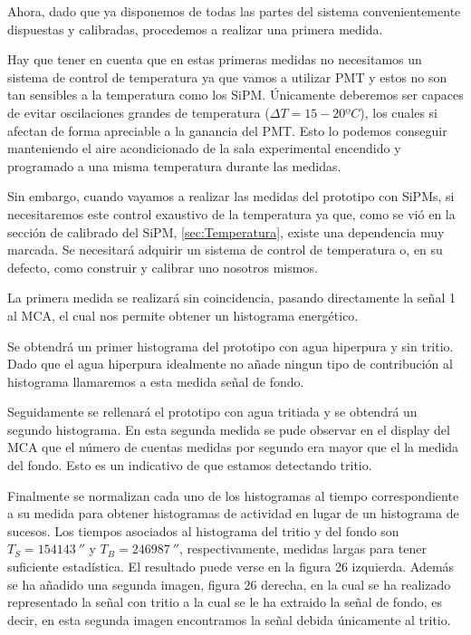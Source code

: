 Ahora, dado que ya disponemos de todas las partes del sistema convenientemente dispuestas y calibradas, procedemos a realizar una primera medida.

Hay que tener en cuenta que en estas primeras medidas no necesitamos un sistema de control de temperatura ya que vamos a utilizar PMT y estos no son tan sensibles a la temperatura como los SiPM. Únicamente deberemos ser capaces de evitar oscilaciones grandes de temperatura ($\Delta T=15-20ºC$), los cuales si afectan de forma apreciable a la ganancia del PMT. Esto lo podemos conseguir manteniendo el aire acondicionado de la sala experimental encendido y programado a una misma temperatura durante las medidas. 

Sin embargo, cuando vayamos a realizar las medidas del prototipo con SiPMs, si necesitaremos este control exaustivo de la temperatura ya que, como se vió en la sección de calibrado del SiPM, \ref{sec:Temperatura}, existe una dependencia muy marcada. Se necesitará adquirir un sistema de control de temperatura o, en su defecto, como construir y calibrar uno nosotros mismos.

La primera medida se realizará sin coincidencia, pasando directamente la señal 1 al MCA, el cual nos permite obtener un histograma energético.

Se obtendrá un primer histograma del prototipo con agua hiperpura y sin tritio. Dado que el agua hiperpura idealmente no añade ningun tipo de contribución al histograma llamaremos a esta medida señal de fondo. 

Seguidamente se rellenará el prototipo con agua tritiada y se obtendrá un segundo histograma. En esta segunda medida se pude observar en el display del MCA que el número de cuentas medidas por segundo era mayor que el la medida del fondo. Esto es un indicativo de que estamos detectando tritio. 

Finalmente se normalizan cada uno de los histogramas al tiempo correspondiente a su medida para obtener histogramas de actividad en lugar de un histograma de sucesos. Los tiempos asociados al histograma del tritio y del fondo son $T_S=154143~\second$  y $T_B=246987~\second$, respectivamente, medidas largas para tener suficiente estadística. El resultado puede verse en la figura 26 izquierda. Además se ha añadido una segunda imagen, figura 26 derecha, en la cual se ha realizado representado la señal con tritio a la cual se le ha extraido la señal de fondo, es decir, en esta segunda imagen encontramos la señal debida únicamente al tritio.

